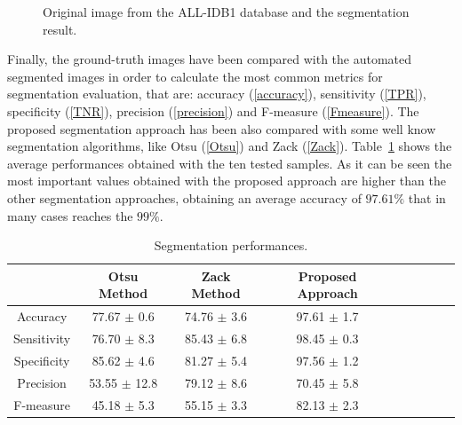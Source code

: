 \documentclass[final,a4paper,12pt,english]{UnicaPhdThesis3}
\begin{document}
	
	\begin{figure}[!htbp]
		
		\begin{center}
			\centering
			\caption{\label{fig:ex5}Original image from the ALL-IDB1 database and the segmentation result.}
		\end{center}
	\end{figure}
	
	Finally, the ground-truth images have been compared with the automated segmented images in order to calculate the most common metrics for segmentation evaluation, that are: accuracy (\ref{accuracy}), sensitivity (\ref{TPR}), specificity (\ref{TNR}), precision (\ref{precision}) and F-measure (\ref{Fmeasure}). The proposed segmentation approach has been also compared with some well know segmentation algorithms, like Otsu (\ref{Otsu}) and Zack (\ref{Zack}). Table~\ref{tab:table2} shows the average performances obtained with the ten tested samples. As it can be seen the most important values obtained with the proposed approach are higher than the other segmentation approaches, obtaining an average accuracy of $97.61\%$ that in many cases reaches the $99\%$.
	\begin{table}[!b]
		\caption{Segmentation performances.}
		\centering\tabcolsep=2mm
		\begin{tabular}{ccccccccc}
			&	\hspace{2mm} Otsu Method \hspace{2mm}	 &	\hspace{1mm} Zack Method  \hspace{1mm}	&	Proposed Approach\\ \hline \hline
			Accuracy	&   77.67 $\pm$  0.6	 &		74.76	$\pm$  3.6 		&	    97.61 $\pm$  1.7\\
			Sensitivity 	&   76.70 $\pm$  8.3 	 &		85.43	$\pm$  6.8	 	&	    98.45 $\pm$  0.3\\
			Specificity	&   85.62 $\pm$  4.6	 &	 	81.27	$\pm$  5.4	 	&	    97.56 $\pm$  1.2\\
			Precision  	&   53.55 $\pm$  12.8 &		79.12	$\pm$  8.6	 	&	    70.45 $\pm$  5.8 \\
			F-measure 	&   45.18 $\pm$  5.3	 &	 	55.15	$\pm$  3.3	 	&	    82.13 $\pm$  2.3\\
			\hline
		\end{tabular}
		\label{tab:table2}
	\end{table}
	
\end{document}
